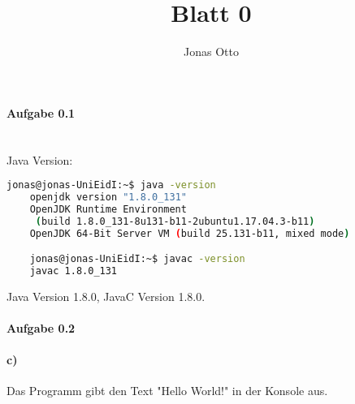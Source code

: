 \documentclass{article}
\newcommand{\newlineparagraph}[1]{\paragraph{#1}\mbox{}\\}
\begin{document}
\title{Blatt 0}
\author{Jonas Otto}
\maketitle

\newlineparagraph{Aufgabe 0.1}
  Java Version:
  \begin{lstlisting}[language=bash]
    jonas@jonas-UniEidI:~$ java -version
    openjdk version "1.8.0_131"
    OpenJDK Runtime Environment
     (build 1.8.0_131-8u131-b11-2ubuntu1.17.04.3-b11)
    OpenJDK 64-Bit Server VM (build 25.131-b11, mixed mode)

    jonas@jonas-UniEidI:~$ javac -version
    javac 1.8.0_131
  \end{lstlisting}
  Java Version 1.8.0, JavaC Version 1.8.0.

\paragraph{Aufgabe 0.2}
  \paragraph{c)}
    Das Programm gibt den Text "Hello World!" in der Konsole aus.
\end{document}
